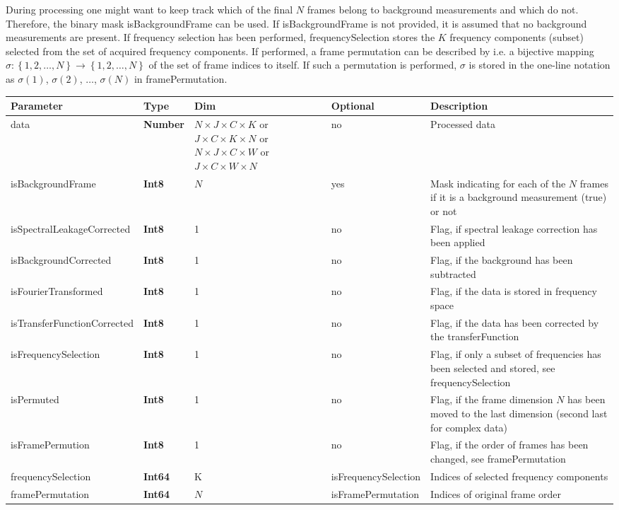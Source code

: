 \documentclass[landscape,a4paper]{article} %
\newcommand{\inltab}[1]{{\ttfamily\bfseries\color{blue}#1}}
\newcommand{\inlvar}[1]{{\ttfamily#1}}
\begin{document}
\begin{multicols}{2}
During processing one might want to keep track which of the final $N$ frames belong to background measurements and which do not. Therefore, the binary mask \inlvar{isBackgroundFrame} can be used. If \inlvar{isBackgroundFrame} is not provided, it is assumed that no background measurements are present. If frequency selection has been performed, \inlvar{frequencySelection} stores the $K$ frequency components (subset) selected from the set of acquired frequency components. If performed, a frame permutation can be described by i.e. a bijective mapping $\sigma : \left\{ 1,2,\dots,N \right\} \rightarrow \left\{ 1,2,\dots,N \right\}$ of the set of frame indices to itself. If such a permutation is performed, $\sigma$ is stored in the one-line notation as $\sigma(1)$, $\sigma(2)$, $\dots$, $\sigma(N)$ in \inlvar{framePermutation}.

\end{multicols}

\noindent \begin{tabularx}{\columnwidth}{llp{3cm}lX} 
\textbf{Parameter} & \textbf{Type} & \textbf{Dim} &  \textbf{Optional} & \textbf{Description} \\ \hline 
\inlvar{data} & \inltab{Number} & $N \times J \times C \times K$ or $ J \times C \times K\times N$ or $N \times J \times C \times W$ or $ J \times C \times W \times N$ & no & Processed data \\ \hline
\inlvar{isBackgroundFrame} & \inltab{Int8} & $N$ & yes & Mask indicating for each of the $N$ frames if it is a background measurement (true) or not \\ \hline
\inlvar{isSpectralLeakageCorrected} & \inltab{Int8} & 1 & no & Flag, if spectral leakage correction has been applied \\ \hline
\inlvar{isBackgroundCorrected} & \inltab{Int8} & 1 & no & Flag, if the background has been subtracted \\ \hline
\inlvar{isFourierTransformed} & \inltab{Int8} & 1 & no & Flag, if the data is stored in frequency space \\ \hline
\inlvar{isTransferFunctionCorrected} & \inltab{Int8} & 1 & no & Flag, if the data has been corrected by the \inlvar{transferFunction}\\ \hline 
\inlvar{isFrequencySelection} & \inltab{Int8} & 1 & no & Flag, if only a subset of frequencies has been selected and stored, see \inlvar{frequencySelection}\\ \hline 
\inlvar{isPermuted} & \inltab{Int8} & 1 & no & Flag, if the frame dimension $N$ has been moved to the last dimension (second last for complex data) \\ \hline
\inlvar{isFramePermution} & \inltab{Int8} & 1 & no & Flag, if the order of frames has been changed, see \inlvar{framePermutation} \\ \hline 
\inlvar{frequencySelection} & \inltab{Int64} & K & \inlvar{isFrequencySelection} & Indices of selected frequency components \\ \hline
\inlvar{framePermutation} & \inltab{Int64} & $N$ & \inlvar{isFramePermutation} & Indices of original frame order\\ \hline
\end{tabularx} 
\end{document}
